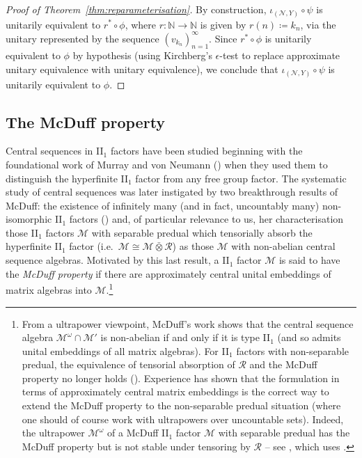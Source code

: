 \documentclass[a4paper,11pt]{amsart}
\theoremstyle{definition}
\numberwithin{equation}{section}
\numberwithin{theorem}{section}
\newcommand{\R}{\mathcal R}
\newcommand{\N}{\mathbb N}
\newcommand{\M}{\mathcal{M}}
\newcommand{\barotimes}{\bar\otimes}
\begin{document}
\begin{proof}[Proof of Theorem~\ref{thm:reparameterisation}]
By construction, $\iota_{(\mathcal{N}, Y)} \circ \psi$ is unitarily equivalent to $r^* \circ \phi$, where $r:\N \rightarrow \N$ is given by $r(n) \coloneqq k_n$, via the unitary represented by the sequence $(v_{k_n})_{n=1}^\infty$. Since $r^* \circ \phi$ is unitarily equivalent to $\phi$ by hypothesis (using Kirchberg's $\epsilon$-test to replace approximate unitary equivalence with unitary equivalence), we conclude that $\iota_{(\mathcal{N}, Y)} \circ \psi$ is unitarily equivalent to $\phi$. 
\end{proof}

\subsection{The McDuff property}\label{sec:McDuff}


Central sequences in II$_1$ factors have been studied beginning with the foundational work of Murray and von Neumann (\cite{MvN43}) when they used them to distinguish the hyperfinite II$_1$ factor from any free group factor. The systematic study of central sequences was later instigated by two breakthrough results of McDuff: the existence of infinitely many (and in fact, uncountably many) non-isomorphic II$_1$ factors (\cite{Du69a,Du69b}) and, of particular relevance to us, her characterisation those II$_1$ factors $\M$ with separable predual which tensorially absorb the hyperfinite II$_1$ factor (i.e.\ $\M\cong\M\barotimes\R$) as those $\mathcal M$ with  non-abelian central sequence algebras.  Motivated by this last result, a II$_1$ factor $\M$ is said to have the \emph{McDuff property} if there are approximately central unital embeddings of matrix algebras into $\M$.\footnote{From a ultrapower viewpoint, McDuff's work shows that the central sequence algebra $\mathcal M^\omega\cap \mathcal M'$ is non-abelian if and only if it is type II$_1$ (and so admits unital embeddings of all matrix algebras).  For II$_1$ factors with non-separable predual, the equivalence of tensorial absorption of $\mathcal R$ and the McDuff property no longer holds (\cite[Theorem~1.5]{FHKT}). Experience has shown that the formulation in terms of approximately central matrix embeddings is the correct way to extend the McDuff property to the non-separable predual situation (where one should of course work with ultrapowers over uncountable sets).  Indeed, the ultrapower $\mathcal M^\omega$ of a McDuff II$_1$ factor $\M$ with separable predual has the McDuff property but is not stable under tensoring by $\mathcal R$ -- see \cite[Footnote~65]{CGSTW}, which uses \cite{Gh15}.}
\end{document}
